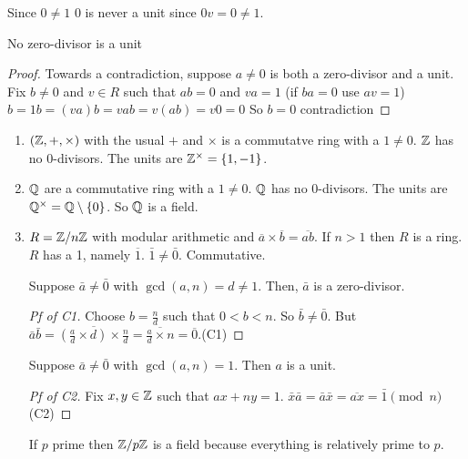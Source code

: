\documentclass[notes.tex]{subfiles}
\begin{document}
\begin{remark}
	Since $0\ne 1$ 0 is never a unit since $0v = 0 \ne 1$.
\end{remark}

\begin{proposition}
	No zero-divisor is a unit
\end{proposition}
\begin{proof}
	Towards a contradiction, suppose $a\ne 0$ is both a zero-divisor and a unit.
	Fix $b\ne 0$ and $v\in R$ such that $ab = 0$ and $va = 1$ (if $ba = 0$ use $av = 1$)
	$b = 1b = (va)b = vab = v(ab) = v0 = 0$
	So $b=0$ contradiction
\end{proof}
\begin{eg}\leavevmode
\begin{enumerate}
	\item $(\mathbb{Z}, +, \times)$ with the usual $+$ and $\times$ is a commutatve ring with a $1\ne 0$.
	$\mathbb{Z}$ has no 0-divisors.
	The units are $\mathbb{Z}^\times = \{1, -1\}$.
	\item $\mathbb{Q}$ are a commutative ring with a $1\ne 0$.
	$\mathbb{Q}$ has no 0-divisors. The units are $\mathbb{Q}^\times = \mathbb{Q}\setminus \{0\}$. So $\mathbb{Q}$ is a field.
	\item $R = \mathbb{Z}/n\mathbb{Z}$ with modular arithmetic and $\overline a \times\overline b = \overline{ab}$. If $n>1$ then $R$ is a ring. $R$ has a 1, namely $\overline1$. $\bar1\ne\bar0$. Commutative.
	\begin{claim}[C1]
		Suppose $\bar a\ne \bar 0$ with $\gcd(a, n) = d\ne 1$.
		Then, $\bar a$ is a zero-divisor.
	\end{claim}
	\begin{proof}[Pf of C1]
		Choose $b = \frac{n}{d}$ such that $0 < b < n$.
		So $\bar b \ne \bar 0$. But $\bar a\bar b = \overline{\left(\frac{a}{d}\times d\right)\times \frac{n}{d}} = \overline{\frac{a}{d}\times n} = \overline0$.\qedhere(C1)
	\end{proof}
	\begin{claim}[C2]
		Suppose $\bar a\ne \bar 0$ with $\gcd(a, n) = 1$. Then $a$ is a unit.
	\end{claim}
	\begin{proof}[Pf of C2]
		Fix $x, y\in \mathbb{Z}$ such that $ax + ny = 1$.
		$\bar x\bar a = \bar a \bar x = \overline{ax} = \bar 1\pmod n$\qedhere(C2)
	\end{proof}
	\begin{corollary}
		If $p$ prime then $\mathbb{Z}/p\mathbb{Z}$ is a field because everything is relatively prime to $p$.
	\end{corollary}
\end{enumerate}
\end{eg}
\end{document}
